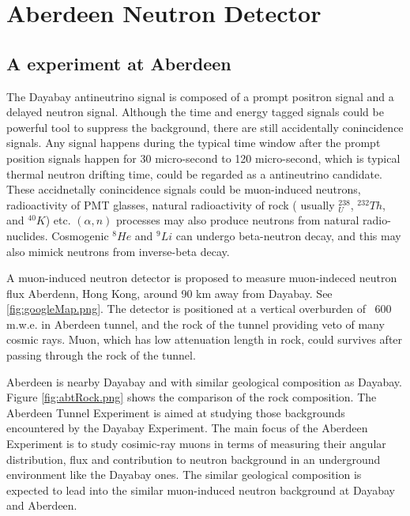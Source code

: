 \chapter{Aberdeen Neutron Detector}
\section{A experiment at Aberdeen}

The Dayabay antineutrino signal is composed of a prompt positron signal and a delayed
neutron signal. Although the time and energy tagged signals could be powerful tool to suppress
the background, there are still accidentally conincidence signals. Any signal happens during
the typical time window after the prompt position signals happen for 30 micro-second to 120 micro-second,
which is typical thermal neutron drifting time, 
could be regarded as a antineutrino candidate. These accidnetally conincidence signals could be
muon-induced neutrons, radioactivity of PMT glasses, natural radioactivity of rock
( usually $^238_U$, $^232Th$, and $^40K$) etc. $(\alpha,n)$ processes may also produce
neutrons from natural radio-nuclides. Cosmogenic $^8He$ and $^9Li$ can undergo beta-neutron decay,
and this may also mimick neutrons from inverse-beta decay.


A muon-induced neutron detector is proposed to measure muon-indeced neutron flux Aberdenn, Hong Kong,
around 90 km away from Dayabay. See \ref{fig:googleMap.png}.
The detector is positioned at a vertical overburden of ~600 m.w.e. in Aberdeen tunnel, and the rock of the tunnel
providing veto of many cosmic rays. Muon, which has low attenuation length in rock, could
survives after passing through the rock of the tunnel.

Aberdeen is nearby Dayabay and with similar geological composition as Dayabay. Figure \ref{fig:abtRock.png}
shows the comparison of the rock composition.
The Aberdeen Tunnel Experiment is aimed at studying those backgrounds encountered by the Dayabay
Experiment. The main focus of the Aberdeen Experiment is to study cosimic-ray muons in terms
of measuring their angular distribution, flux and contribution to neutron background in an
underground environment like the Dayabay ones. The similar geological composition
is expected to lead into the similar muon-induced neutron background at Dayabay and Aberdeen.


